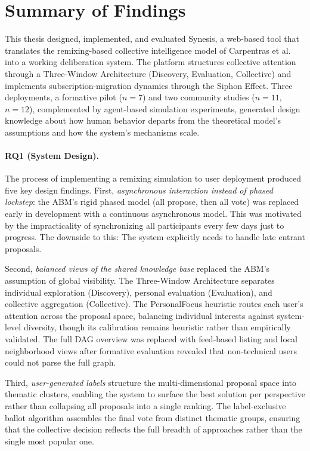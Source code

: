 \documentclass[a4paper, 12pt, twoside]{iviathesis}
\begin{document}
\section{Summary of Findings}
\label{sec:summary-findings}

This thesis designed, implemented, and evaluated Synesis, a web-based tool that translates the remixing-based collective intelligence model of Carpentras et al.\ \cite{carpentras_empowering_2024, carpentras_wisdom_2025} into a working deliberation system. The platform structures collective attention through a Three-Window Architecture (Discovery, Evaluation, Collective) and implements subscription-migration dynamics through the Siphon Effect. Three deployments, a formative pilot ($n=7$) and two community studies ($n=11$, $n=12$), complemented by agent-based simulation experiments, generated design knowledge about how human behavior departs from the theoretical model's assumptions and how the system's mechanisms scale.

\paragraph{RQ1 (System Design).}
The process of implementing a remixing simulation to user deployment produced five key design findings. First, \textit{asynchronous interaction instead of phased lockstep}: the ABM's rigid phased model (all propose, then all vote) was replaced early in development with a continuous asynchronous model. This was motivated by the impracticality of synchronizing all participants every few days just to progress. The downside to this: The system explicitly needs to handle late entrant proposals.

Second, \textit{balanced views of the shared knowledge base} replaced the ABM's assumption of global visibility. The Three-Window Architecture separates individual exploration (Discovery), personal evaluation (Evaluation), and collective aggregation (Collective). The PersonalFocus heuristic routes each user's attention across the proposal space, balancing individual interests against system-level diversity, though its calibration remains heuristic rather than empirically validated. The full DAG overview was replaced with feed-based listing and local neighborhood views after formative evaluation revealed that non-technical users could not parse the full graph.

Third, \textit{user-generated labels} structure the multi-dimensional proposal space into thematic clusters, enabling the system to surface the best solution per perspective rather than collapsing all proposals into a single ranking. The label-exclusive ballot algorithm assembles the final vote from distinct thematic groups, ensuring that the collective decision reflects the full breadth of approaches rather than the single most popular one.
\end{document}
